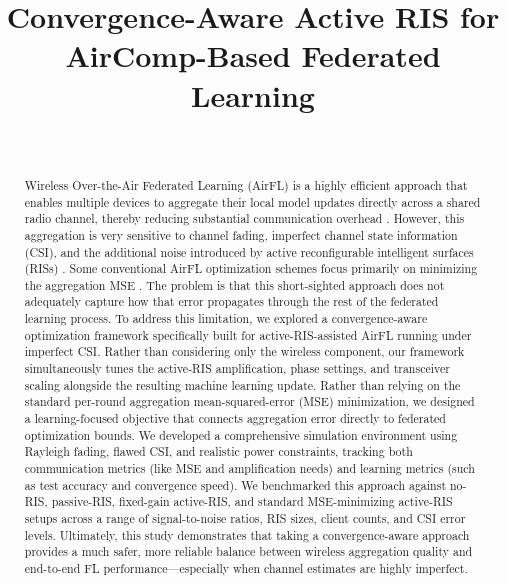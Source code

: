\documentclass[journal, twocolumn]{IEEEtran}
\begin{document}
\title{Convergence-Aware Active RIS for AirComp-Based Federated Learning}

\author{
    \\
}

\maketitle

\begin{abstract}
Wireless Over-the-Air Federated Learning (AirFL) is a highly efficient approach that enables multiple devices to aggregate their local model updates directly across a shared radio channel, thereby reducing substantial communication overhead \cite{qin2021federated}. However, this aggregation is very sensitive to channel fading, imperfect channel state information (CSI), and the additional noise introduced by active reconfigurable intelligent surfaces (RISs) \cite{long2021active, zhi2022active}. Some conventional AirFL optimization schemes focus primarily on minimizing the aggregation MSE \cite{ni2021integrating}. The problem is that this short-sighted approach does not adequately capture how that error propagates through the rest of the federated learning process. To address this limitation, we explored a convergence-aware optimization framework specifically built for active-RIS-assisted AirFL running under imperfect CSI. Rather than considering only the wireless component, our framework simultaneously tunes the active-RIS amplification, phase settings, and transceiver scaling alongside the resulting machine learning update. Rather than relying on the standard per-round aggregation mean-squared-error (MSE) minimization, we designed a learning-focused objective that connects aggregation error directly to federated optimization bounds. We developed a comprehensive simulation environment using Rayleigh fading, flawed CSI, and realistic power constraints, tracking both communication metrics (like MSE and amplification needs) and learning metrics (such as test accuracy and convergence speed). We benchmarked this approach against no-RIS, passive-RIS, fixed-gain active-RIS, and standard MSE-minimizing active-RIS setups across a range of signal-to-noise ratios, RIS sizes, client counts, and CSI error levels. Ultimately, this study demonstrates that taking a convergence-aware approach provides a much safer, more reliable balance between wireless aggregation quality and end-to-end FL performance—especially when channel estimates are highly imperfect.
\end{abstract}
\end{document}

